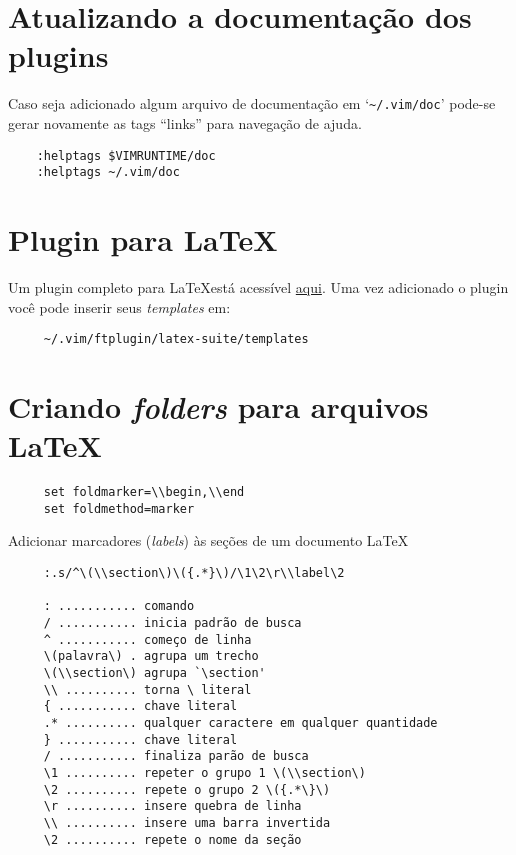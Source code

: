\section{Atualizando a documentação dos plugins}\label{sec:Atualizando a documentação dos plugins}
Caso seja adicionado algum arquivo de documentação em `\verb+~/.vim/doc+' pode-se 
gerar novamente as tags ``links'' para navegação de ajuda.

\begin{verbatim}
    :helptags $VIMRUNTIME/doc
    :helptags ~/.vim/doc
\end{verbatim}


\section{Plugin para \LaTeX}
\label{Plugin para LaTeX}

Um plugin completo para \LaTeX está acessível
\href{http://vim-latex.sourceforge.net/}{aqui}. Uma vez adicionado o plugin você pode
inserir seus {\em templates} em:

\begin{verbatim}
     ~/.vim/ftplugin/latex-suite/templates
\end{verbatim}


\section{Criando {\em folders} para arquivos \LaTeX}
\label{Criando folders para arquivos LaTeX}

\begin{verbatim}
     set foldmarker=\\begin,\\end
     set foldmethod=marker
\end{verbatim}

Adicionar marcadores ({\em labels}) às seções de um documento \LaTeX
\begin{verbatim}
     :.s/^\(\\section\)\({.*}\)/\1\2\r\\label\2
     
     : ........... comando
     / ........... inicia padrão de busca
     ^ ........... começo de linha
     \(palavra\) . agrupa um trecho
     \(\\section\) agrupa `\section'
     \\ .......... torna \ literal
     { ........... chave literal
     .* .......... qualquer caractere em qualquer quantidade
     } ........... chave literal
     / ........... finaliza parão de busca
     \1 .......... repeter o grupo 1 \(\\section\) 
     \2 .......... repete o grupo 2 \({.*\}\)
     \r .......... insere quebra de linha
     \\ .......... insere uma barra invertida
     \2 .......... repete o nome da seção
\end{verbatim}

